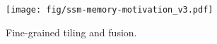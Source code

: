 



\begin{figure}[!tb]
    \centering
    \texttt{[image: fig/ssm-memory-motivation\_v3.pdf]}
    \caption{Fine-grained tiling and fusion.}
    \vspace{-10pt}
    \label{fig:tiling}
\end{figure}






